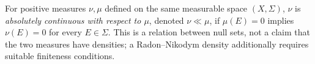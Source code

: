 
For positive measures $\nu,\mu$ defined on the same measurable space $(X,\Sigma)$, $\nu$ is \emph{absolutely continuous with respect to $\mu$}, denoted $\nu\ll\mu$, if $\mu(E)=0$ implies $\nu(E)=0$ for every $E\in\Sigma$. This is a relation between null sets, not a claim that the two measures have densities; a Radon--Nikodym density additionally requires suitable finiteness conditions.
